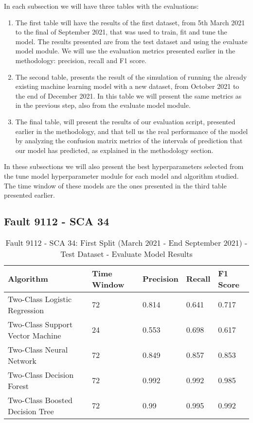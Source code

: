 In each subsection we will have three tables with the evaluations:
\begin{enumerate}
    \item 
The first table will have the results of the first dataset, from 5th March 2021 to the final of September 2021, that was used to train, fit and tune the model. The results presented are from the test dataset and using the evaluate model module. We will use the evaluation metrics presented earlier in the methodology: precision, recall and F1 score.
    \item
The second table, presents the result of the simulation of running the already existing machine learning model with a new dataset, from October 2021 to the end of December 2021. In this table we will present the same metrics as in the previous step, also from the evaluate model module.
    \item
The final table, will present the results of our evaluation script, presented earlier in the methodology, and that tell us the real performance of the model by analyzing the confusion matrix metrics of the intervals of prediction that our model has predicted, as explained in the methodology section.
\end{enumerate}
In these subsections we will also present the best hyperparameters selected from the tune model hyperparameter module for each model and algorithm studied. The time window of these models are the ones presented in the third table presented earlier.



\subsection{Fault 9112 - SCA 34}

\begin{table}[!ht]
    \centering
    \begin{tabular}{|l|l|l|l|l|}
    \hline
        Algorithm & Time Window & Precision & Recall & F1 Score \\ \hline
        Two-Class Logistic Regression & 72 & 0.814 & 0.641 & 0.717 \\ \hline
        Two-Class Support Vector Machine & 24 & 0.553 & 0.698 & 0.617 \\ \hline
        Two-Class Neural Network & 72 & 0.849 & 0.857 & 0.853 \\ \hline
        Two-Class Decision Forest & 72 & 0.992 & 0.992 & 0.985 \\ \hline
        Two-Class Boosted Decision Tree & 72 & 0.99 & 0.995 & 0.992 \\ \hline
    \end{tabular}
    \caption{Fault 9112 - SCA 34: First Split (March 2021 - End September 2021) - Test Dataset - Evaluate Model Results}
    \label{9112_SCA34_1st}
\end{table}


